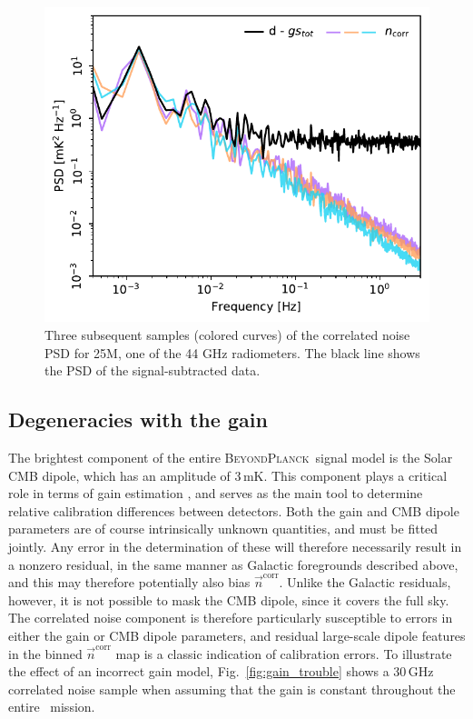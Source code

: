\documentclass[twocolumn]{aa}
\newcommand{\n}[0]{\vec{n}}
\newcommand{\BP}{\textsc{BeyondPlanck}}
\begin{document}
\begin{figure}
	\begin{center}
		\includegraphics[width=\linewidth]{figs/ps_ncorr_samples.pdf}
	\end{center}
	\caption{Three subsequent samples (colored curves) of the
          correlated noise PSD for 25M, one of the 44 GHz
          radiometers. The black line shows the PSD of the
          signal-subtracted data.
		\label{fig:ps_samples}}
\end{figure}


\subsection{Degeneracies with the gain}

The brightest component of the entire \BP\ signal model is the Solar
CMB dipole, which has an amplitude of 3\,mK. This component plays a
critical role in terms of gain estimation \citep{bp09}, and serves as
the main tool to determine relative calibration differences between
detectors. Both the gain and CMB dipole parameters are of course
intrinsically unknown quantities, and must be fitted jointly. Any
error in the determination of these will therefore necessarily result
in a nonzero residual, in the same manner as Galactic foregrounds
described above, and this may therefore potentially also bias
$\n^{\mathrm{corr}}$. Unlike the Galactic residuals, however, it is
not possible to mask the CMB dipole, since it covers the full sky. The
correlated noise component is therefore particularly susceptible to
errors in either the gain or CMB dipole parameters, and residual
large-scale dipole features in the binned $\n^{\mathrm{corr}}$ map is
a classic indication of calibration errors. To illustrate the effect
of an incorrect gain model, Fig.~\ref{fig:gain_trouble} shows a
30\,GHz correlated noise sample when assuming that the gain is
constant throughout the entire \Planck\ mission.
\end{document}
